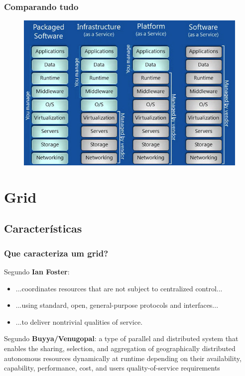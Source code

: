 \documentclass[10pt]{beamer}
\begin{document}
	\begin{frame}%
	\frametitle{Comparando tudo}
		\begin{figure}
		\centering
			\includegraphics[scale=0.4]{./figuras/iaas-paas-saas.jpg}
		\end{figure}
	\end{frame}

\section{Grid}
	\subsection{Características}

		\begin{frame}
		\frametitle{Que caracteriza um grid?}
			\begin{block}{Segundo \textbf{Ian Foster}:}
			\begin{itemize}
				\item ...coordinates resources that are not subject to centralized control...
				\item ...using standard, open, general-purpose protocols and interfaces...
				\item ...to deliver nontrivial qualities of service.
			\end{itemize}
			\end{block}
			\begin{block}{Segundo \textbf{Buyya/Venugopal}:}
				a type of parallel and distributed system that enables the sharing, selection, and aggregation of geographically distributed autonomous resources dynamically at runtime depending on their availability, capability, performance, cost, and users quality-of-service requirements
			\end{block}
		\end{frame}
\end{document}
